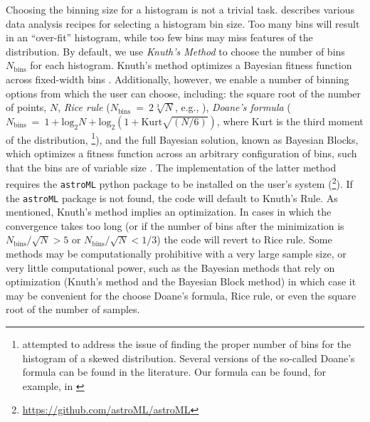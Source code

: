 \documentclass{emulateapj}
\begin{document}
Choosing the binning size for a histogram is not a trivial task.  \citet{hogg08} describes various data analysis recipes for selecting a histogram bin size. Too many bins will result in an ``over-fit'' histogram, while too few bins may miss features of the distribution. 
By default, we use \emph{Knuth's Method} to choose the number of bins $N_\mathrm{bins}$ for each histogram. Knuth's method  optimizes a Bayesian fitness function across fixed-width bins \citep{knuth06}. Additionally, however, we enable a number of binning options from which the user can choose, including: 
the square root of the number of points, $N$, \emph{Rice rule} ($N_\mathrm{bins}~=~2\sqrt[3]{N}$, e.g., \citealt{hastie09}), 
\emph{Doane's formula} ($N_\mathrm{bins}~=~1 + \mathrm{log}_2{N} + \mathrm{log}_2\left(1 + \mathrm{Kurt}\sqrt{(N / 6)}\right)$, where Kurt is the third moment of the distribution, \citealt{doane76}\footnote{\citet{doane76} attempted to address the issue of finding the proper number of bins for the histogram of a skewed distribution. Several versions of the so-called Doane's formula can be found in the literature. Our formula can be found, for example, in \citealt{bonate11}}), and the full Bayesian solution, known as Bayesian Blocks, which optimizes a fitness function across an arbitrary configuration of bins, such that the bins are of variable size \citep{scargle13}. The implementation of the latter method requires the \verb=astroML= python package to be installed on the user's system (\citealt{astroml}\footnote{\url{https://github.com/astroML/astroML}}). If the \verb=astroML= package is not found, the code will default to Knuth's Rule. 
As mentioned, Knuth's method implies an optimization. In cases in which the convergence takes too long (or if the number of bins after the minimization is  $N_\mathrm{bins}/\sqrt{N} > 5$ or $N_\mathrm{bins}/\sqrt{N} < 1/3$) the code will revert to Rice rule.
Some methods may be computationally prohibitive with a very large sample size, or very little computational power, such as the Bayesian methods that rely on optimization (Knuth's method and the Bayesian Block method) in which case it may be convenient for the choose Doane's formula, Rice rule, or even the square root of the number of samples. 
\end{document}
